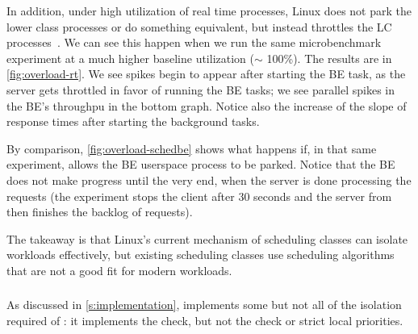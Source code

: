 In addition, under high utilization of real time processes, Linux does not park
the lower class processes or do something equivalent, but instead throttles the
\fifoclass{} LC processes~\cite{lkml-deadline-srv}. We can see this happen when
we run the same microbenchmark experiment at a much higher baseline utilization
($\sim$ 100\%). The results are in \autoref{fig:overload-rt}. We see spikes
begin to appear after starting the BE task, as the \fifoclass{} server gets
throttled in favor of running the BE tasks; we see parallel spikes in the BE's
throughpu in the bottom graph. Notice also the increase of the slope of response
times after starting the background tasks.

By comparison, \autoref{fig:overload-schedbe} shows what happens if, in that
same experiment, \schedbe{} allows the BE userspace process to be parked. Notice
that the BE does not make progress until the very end, when the server is done
processing the requests (the experiment stops the client after 30 seconds and
the server from then finishes the backlog of requests).

The takeaway is that Linux's current mechanism of scheduling classes can isolate
workloads effectively, but existing scheduling classes use scheduling
algorithms that are not a good fit for modern workloads.


\subsubsection{\schedidle}\label{ss:schedidle}

As discussed in \autoref{s:implementation}, \schedidle{} implements some but not
all of the isolation required of \beclass{}: it implements the \entry{} check,
but not the \exit{} check or strict local priorities.

